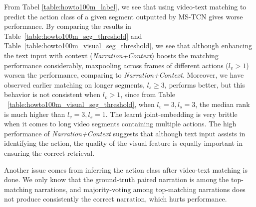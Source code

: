 From Tabel \ref{table:howto100m_label}, we see that using video-text matching to predict the action class of a given segment outputted by MS-TCN gives worse performance. By comparing the results in Table~\ref{table:howto100m_seg_threshold} and Table~\ref{table:howto100m_visual_seg_threshold}, we see that although enhancing the text input with context (\textit{Narration+Context}) boosts the matching performance considerably, maxpooling across frames of different actions ($l_v >1$) worsen the performance, comparing to \textit{Narration+Context}. 
Moreover, we have observed earlier matching on longer segments, $l_s \geq 3$, performs better, but this behavior is not consistent when $l_v > 1$, since from Table ~\ref{table:howto100m_visual_seg_threshold}, when $l_v=3,l_s=3$, the median rank is much higher than $l_v=3,l_s=1$. The learnt joint-embedding is very brittle when it comes to long video segments containing multiple actions. The high performance of \textit{Narration+Context} suggests that although text input assists in identifying the action, the quality of the visual feature is equally important in ensuring the correct retrieval. 

Another issue comes from inferring the action class after video-text matching is done. We only know that the ground-truth paired narration is among the top-matching narrations, and majority-voting among top-matching narrations does not produce consistently the correct narration, which hurts performance.



